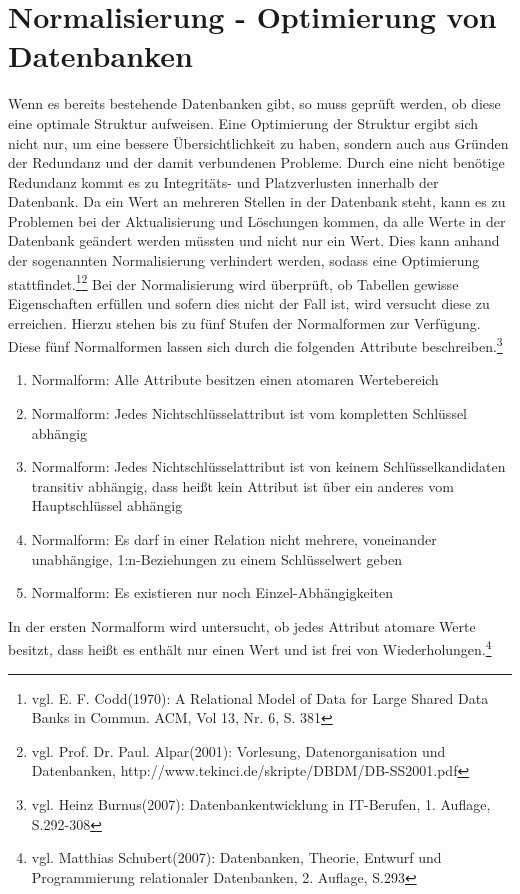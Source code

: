 \section{Normalisierung - Optimierung von Datenbanken}
\label{secNormalisierung}
Wenn es bereits bestehende Datenbanken gibt, so muss geprüft werden, ob diese eine optimale Struktur aufweisen.
Eine Optimierung der Struktur ergibt sich nicht nur, um eine bessere Übersichtlichkeit zu haben, sondern auch aus Gründen der Redundanz und der damit verbundenen Probleme.
Durch eine nicht benötige Redundanz kommt es zu Integritäts- und Platzverlusten innerhalb der Datenbank.
Da ein Wert an mehreren Stellen in der Datenbank steht, kann es zu Problemen bei der Aktualisierung und Löschungen kommen, da alle Werte in der Datenbank geändert werden müssten und nicht nur ein Wert.
Dies kann anhand der sogenannten Normalisierung verhindert werden, sodass eine Optimierung stattfindet.\footnote{vgl. E. F. Codd(1970): A Relational Model of Data for Large Shared Data Banks in Commun. ACM, Vol 13, Nr. 6, S. 381}\footnote{vgl. Prof. Dr. Paul. Alpar(2001): Vorlesung, Datenorganisation und Datenbanken,  http://www.tekinci.de/skripte/DBDM/DB-SS2001.pdf}
Bei der Normalisierung wird überprüft, ob Tabellen gewisse Eigenschaften erfüllen und sofern dies nicht der Fall ist, wird versucht diese zu erreichen.
Hierzu stehen bis zu fünf Stufen der Normalformen zur Verfügung.
Diese fünf Normalformen lassen sich durch die folgenden Attribute beschreiben.\footnote{vgl. Heinz Burnus(2007): Datenbankentwicklung in IT-Berufen, 1. Auflage, S.292-308}

\begin{enumerate}
\item Normalform: Alle Attribute besitzen einen atomaren Wertebereich
\item Normalform: Jedes Nichtschlüsselattribut ist vom kompletten Schlüssel abhängig
\item Normalform: Jedes Nichtschlüsselattribut ist von keinem Schlüsselkandidaten transitiv abhängig, dass heißt kein Attribut ist über ein anderes vom Hauptschlüssel abhängig
\item Normalform: Es darf in einer Relation nicht mehrere, voneinander unabhängige, 1:n-Beziehungen zu einem Schlüsselwert geben
\item Normalform: Es existieren nur noch Einzel-Abhängigkeiten
\end{enumerate}


In der ersten Normalform wird untersucht, ob jedes Attribut atomare Werte besitzt, dass heißt es enthält nur einen Wert und ist frei von Wiederholungen.\footnote{vgl. Matthias Schubert(2007): Datenbanken, Theorie, Entwurf und Programmierung relationaler Datenbanken, 2. Auflage, S.293}


